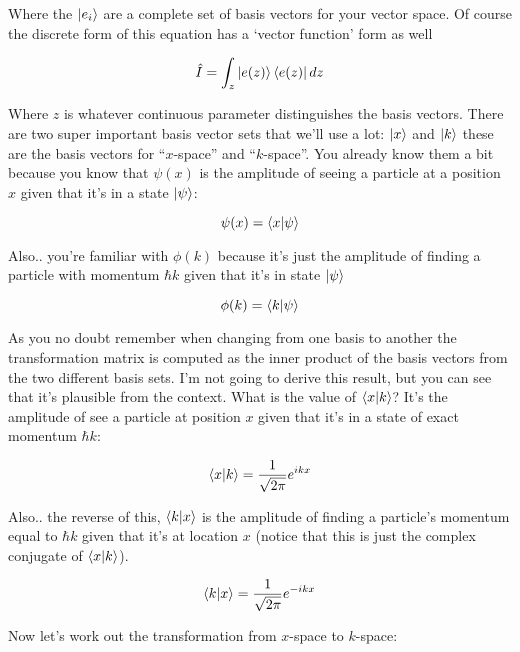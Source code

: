 \documentclass[11pt]{article} %
\begin{document}
Where the $\ket{e_i}$ are a complete set of basis vectors for your vector space. Of course the discrete form of this equation has a `vector function' form as well

\begin{equation}
\hat{I} = \int_z \ket{e(z)}\bra{e(z)} dz
\end{equation}

Where $z$ is whatever continuous parameter distinguishes the basis vectors. There are two super important basis vector sets that we'll use a lot: $\ket{x}$ and $\ket{k}$ these are the basis vectors for ``$x$-space'' and ``$k$-space''. You already know them a bit because you know that $\psi(x)$ is the amplitude of seeing a particle at a position $x$ given that it's in a state $\ket{\psi}$:

\begin{equation}
\psi(x) = \braket{x|\psi}
\end{equation}

Also.. you're familiar with $\phi(k)$ because it's just the amplitude of finding a particle with momentum $\hbar k$ given that it's in state $\ket{\psi}$

\begin{equation}
\phi(k) = \braket{k|\psi}
\end{equation}

As you no doubt remember when changing from one basis to another the transformation matrix is computed as the inner product of the basis vectors from the two different basis sets. I'm not going to derive this result, but you can see that it's plausible from the context. What is the value of $\braket{x|k}$? It's the amplitude of see a particle at position $x$ given that it's in a state of exact momentum $\hbar k$:

\begin{equation}
\braket{x|k} = \frac{1}{\sqrt{2\pi}} e^{ikx}
\end{equation}

Also.. the reverse of this, $\braket{k|x}$ is the amplitude of finding a particle's momentum equal to $\hbar k$ given that it's at location $x$ (notice that this is just the complex conjugate of $\braket{x|k}$).

\begin{equation}
\braket{k|x} = \frac{1}{\sqrt{2\pi}} e^{-ikx}
\end{equation}

Now let's work out the transformation from $x$-space to $k$-space:
\end{document}
